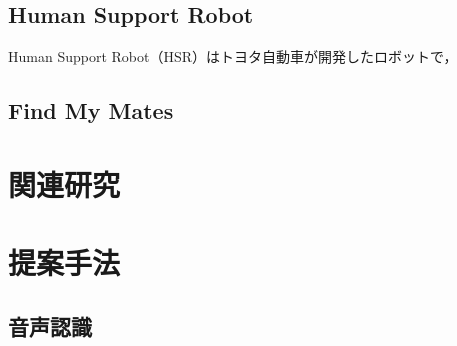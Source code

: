 \documentclass[a4j]{jarticle}
\begin{document}

\subsection{Human Support Robot}
Human Support Robot（HSR）はトヨタ自動車が開発したロボットで，

\subsection{Find My Mates}


\section{関連研究}


\section{提案手法}

\subsection{音声認識}
\end{document}
